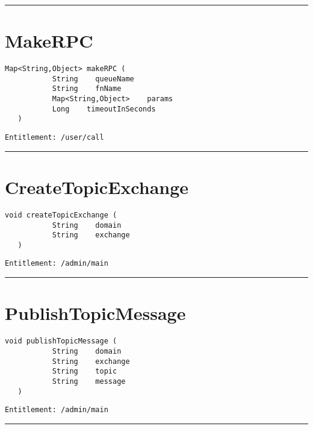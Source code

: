\rule{12cm}{2pt}
\section{MakeRPC}
\label{Api:MakeRPC}
\begin{lstlisting}[style=nonumbers]
   Map<String,Object> makeRPC (
           String    queueName
           String    fnName
           Map<String,Object>    params
           Long    timeoutInSeconds
   )
\end{lstlisting}
\begin{Verbatim}[formatcom=\color{Maroon}]
  Entitlement: /user/call
\end{Verbatim}



\rule{12cm}{2pt}
\section{CreateTopicExchange}
\label{Api:CreateTopicExchange}
\begin{lstlisting}[style=nonumbers]
   void createTopicExchange (
           String    domain
           String    exchange
   )
\end{lstlisting}
\begin{Verbatim}[formatcom=\color{Maroon}]
  Entitlement: /admin/main
\end{Verbatim}



\rule{12cm}{2pt}
\section{PublishTopicMessage}
\label{Api:PublishTopicMessage}
\begin{lstlisting}[style=nonumbers]
   void publishTopicMessage (
           String    domain
           String    exchange
           String    topic
           String    message
   )
\end{lstlisting}
\begin{Verbatim}[formatcom=\color{Maroon}]
  Entitlement: /admin/main
\end{Verbatim}



\rule{12cm}{2pt}
